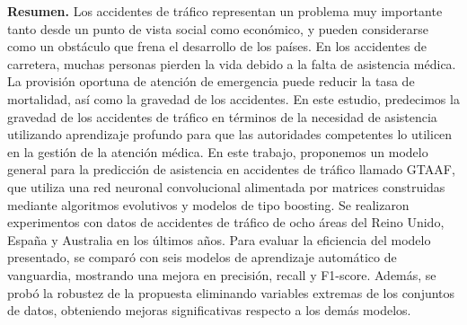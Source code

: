 \textbf{Resumen.} Los accidentes de tráfico representan un problema muy importante tanto desde un punto de vista social como económico, y pueden considerarse como un obstáculo que frena el desarrollo de los países. En los accidentes de carretera, muchas personas pierden la vida debido a la falta de asistencia médica. La provisión oportuna de atención de emergencia puede reducir la tasa de mortalidad, así como la gravedad de los accidentes. En este estudio, predecimos la gravedad de los accidentes de tráfico en términos de la necesidad de asistencia utilizando aprendizaje profundo para que las autoridades competentes lo utilicen en la gestión de la atención médica. En este trabajo, proponemos un modelo general para la predicción de asistencia en accidentes de tráfico llamado GTAAF, que utiliza una red neuronal convolucional alimentada por matrices construidas mediante algoritmos evolutivos y modelos de tipo boosting. Se realizaron experimentos con datos de accidentes de tráfico de ocho áreas del Reino Unido, España y Australia en los últimos años. Para evaluar la eficiencia del modelo presentado, se comparó con seis modelos de aprendizaje automático de vanguardia, mostrando una mejora en precisión, recall y F1-score. Además, se probó la robustez de la propuesta eliminando variables extremas de los conjuntos de datos, obteniendo mejoras significativas respecto a los demás modelos.
